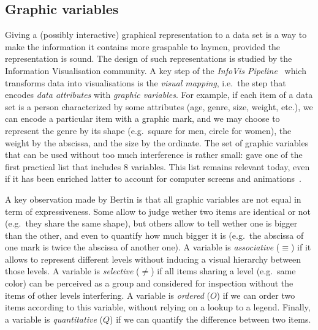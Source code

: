 \documentclass[version=last, pagesize, twoside=off, bibliography=totoc, DIV=calc, fontsize=12pt, a4paper, french, english]{scrartcl}
\begin{document}
\subsection{Graphic variables}
Giving a (possibly interactive) graphical representation to a data set is a way to make the information it contains more graspable to laymen, provided the representation is sound.
The design of such representations is studied by the Information Visualisation community.
A key step of the \emph{InfoVis Pipeline}~\citep{Chi-Riedl-1998} which transforms data into visualisations is the \emph{visual mapping}, i.e.\ the step that encodes \emph{data attributes} with \emph{graphic variables}.
For example, if each item of a data set is a person characterized by some attributes (age, genre, size, weight, etc.), we can encode a particular item with a graphic mark, and we may choose to represent the genre by its shape (e.g.\ square for men, circle for women), the weight by the abscissa, and the size by the ordinate.
The set of graphic variables that can be used without too much interference is rather small: \citet[][chap.~II.c]{bertin-graphique} gave one of the first practical list that includes 8 variables.
This list remains relevant today, even if it has been enriched latter to account for computer screens and animations~\citep[e.g.][chap.~5]{munzner}.

A key observation made by Bertin is that all graphic variables are not equal in term of expressiveness.
Some allow to judge wether two items are identical or not (e.g.\ they share the same shape), but others allow to tell wether one is bigger than the other, and even to quantify how much bigger it is (e.g.\ the abscissa of one mark is twice the abscissa of another one).
A variable is \emph{associative} ($\equiv$) if it allows to represent different levels without inducing a visual hierarchy between those levels.
A variable is \emph{selective} ($\neq$) if all items sharing a level (e.g.\ same color) can be perceived as a group and considered for inspection without the items of other levels interfering.
A variable is \emph{ordered} ($O$) if we can order two items according to this variable, without relying on a lookup to a legend.
Finally, a variable is \emph{quantitative} ($Q$) if we can quantify the difference between two items.
\end{document}
